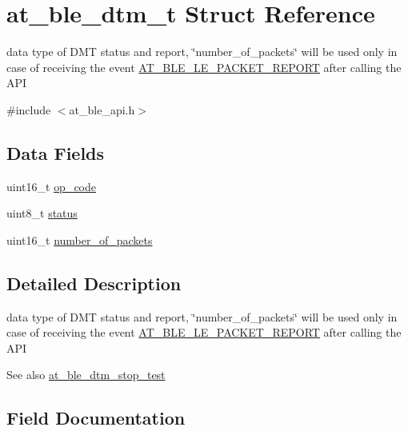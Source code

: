 \hypertarget{structat__ble__dtm__t}{}\section{at\+\_\+ble\+\_\+dtm\+\_\+t Struct Reference}
\label{structat__ble__dtm__t}


data type of D\+MT status and report, \char`\"{}number\+\_\+of\+\_\+packets\char`\"{} will be used only in case of receiving the event \mbox{\hyperlink{at__ble__api_8h_a3324640b95f33169515f89738ed5baebad529dc56000832da6054a10c8689d099}{A\+T\+\_\+\+B\+L\+E\+\_\+\+L\+E\+\_\+\+P\+A\+C\+K\+E\+T\+\_\+\+R\+E\+P\+O\+RT}} after calling the A\+PI  




{\ttfamily \#include $<$at\+\_\+ble\+\_\+api.\+h$>$}

\subsection*{Data Fields}
\begin{DoxyCompactItemize}
\item 
uint16\+\_\+t \mbox{\hyperlink{structat__ble__dtm__t_a9ae90dd1d8198ce61dd0cac01efe7611}{op\+\_\+code}}
\item 
uint8\+\_\+t \mbox{\hyperlink{structat__ble__dtm__t_ade818037fd6c985038ff29656089758d}{status}}
\item 
uint16\+\_\+t \mbox{\hyperlink{structat__ble__dtm__t_a4ae16b3de55d53c6613d86b65fa2ffe7}{number\+\_\+of\+\_\+packets}}
\end{DoxyCompactItemize}


\subsection{Detailed Description}
data type of D\+MT status and report, \char`\"{}number\+\_\+of\+\_\+packets\char`\"{} will be used only in case of receiving the event \mbox{\hyperlink{at__ble__api_8h_a3324640b95f33169515f89738ed5baebad529dc56000832da6054a10c8689d099}{A\+T\+\_\+\+B\+L\+E\+\_\+\+L\+E\+\_\+\+P\+A\+C\+K\+E\+T\+\_\+\+R\+E\+P\+O\+RT}} after calling the A\+PI 

\begin{DoxySeeAlso}{See also}
\mbox{\hyperlink{group__dtm__group_gafa12d16c45ae0e5efc01beba4772ab69}{at\+\_\+ble\+\_\+dtm\+\_\+stop\+\_\+test}} 
\end{DoxySeeAlso}


\subsection{Field Documentation}
\mbox{\label{structat__ble__dtm__t_a4ae16b3de55d53c6613d86b65fa2ffe7}} 
